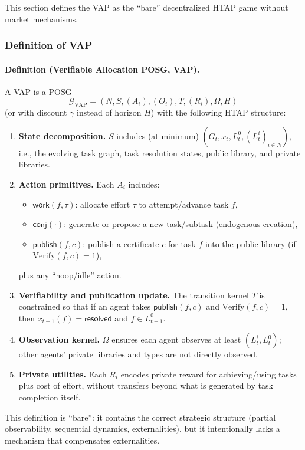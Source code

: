 This section defines the VAP as the ``bare'' decentralized HTAP game without market mechanisms.

\subsubsection{Definition of VAP}

\paragraph{Definition (Verifiable Allocation POSG, VAP).}
A VAP is a POSG
\[
\mathcal{G}_{\mathrm{VAP}} = (N,S,(A_i),(O_i),T,(R_i),\Omega,H)
\]
(or with discount \(\gamma\) instead of horizon \(H\)) with the following HTAP structure:

\begin{enumerate}
\item \textbf{State decomposition.} \(S\) includes (at minimum) \((G_t, x_t, L_t^0, (L_t^i)_{i\in N})\), i.e., the evolving task graph, task resolution states, public library, and private libraries.
\item \textbf{Action primitives.} Each \(A_i\) includes:
\begin{itemize}
\item \(\mathsf{work}(f,\tau)\): allocate effort \(\tau\) to attempt/advance task \(f\),
\item \(\mathsf{conj}(\cdot)\): generate or propose a new task/subtask (endogenous creation),
\item \(\mathsf{publish}(f,c)\): publish a certificate \(c\) for task \(f\) into the public library (if \(\mathrm{Verify}(f,c)=1\)),
\end{itemize}
plus any ``noop/idle'' action.
\item \textbf{Verifiability and publication update.} The transition kernel \(T\) is constrained so that if an agent takes \(\mathsf{publish}(f,c)\) and \(\mathrm{Verify}(f,c)=1\), then \(x_{t+1}(f)=\mathsf{resolved}\) and \(f\in L_{t+1}^0\).
\item \textbf{Observation kernel.} \(\Omega\) ensures each agent observes at least \((L_t^i,L_t^0)\); other agents' private libraries and types are not directly observed.
\item \textbf{Private utilities.} Each \(R_i\) encodes private reward for achieving/using tasks plus cost of effort, without transfers beyond what is generated by task completion itself.
\end{enumerate}

This definition is ``bare'': it contains the correct strategic structure (partial observability, sequential dynamics, externalities), but it intentionally lacks a mechanism that compensates externalities.

